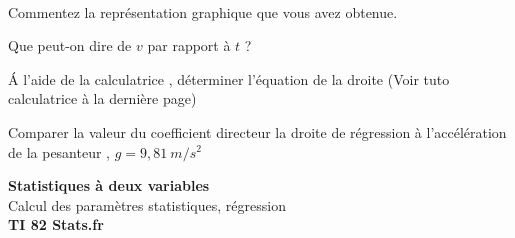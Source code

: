 \documentclass[11pt,a4paper]{article}
\newcommand{\cadreblanc}[1]{%
\medskip\framebox[\linewidth][c]{%
\rule{0mm}{#1mm}}\par
\medskip}
\begin{document}
 \\[5mm]
 Commentez la représentation graphique que vous avez obtenue. \\



\cadreblanc{10}

\vfill 

 Que peut-on dire de $v$ par rapport à $t$ ? \\
\vspace{5mm}
\dotfill

\vfill 

 \'A l'aide de la calculatrice , déterminer l'équation de la droite (Voir tuto calculatrice à la dernière page) \\
\vspace{5mm}
\dotfill

\vfill 

 Comparer la valeur du coefficient directeur la droite de régression à l'accélération de la pesanteur , $g=9,81~m/s^2$ \\ 
\vspace{5mm}
\dotfill




\vfill 

\newpage



\begin{center}
    \begin{tcolorbox}[colback=darkblue!10, colframe=darkblue, width=\textwidth, arc=2mm, boxrule=1pt]
        \begin{center}
            \Large{\textbf{Statistiques à deux variables}} \\[0.2cm]
            \large{Calcul des paramètres statistiques, régression} \\[0.1cm]
            \textbf{TI 82 Stats.fr}
        \end{center}
    \end{tcolorbox}
\end{center}

\vspace{0.2cm}
\end{document}
